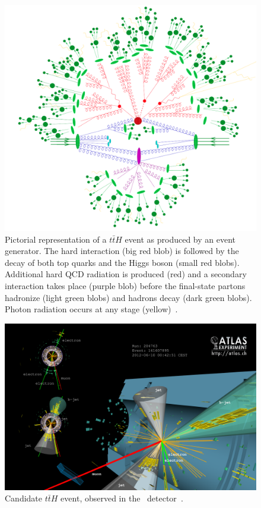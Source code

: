\begin{figure}[p]
  \centering
  \includegraphics[width=\textwidth, clip=true, trim=0 0 0 0]
  {figs/mc_gen/full_mc_event.png}
  \caption[
    Pictorial representation of a $t\bar{t}H$ event as produced by an event
    generator~\cite{Gleisberg:2008ta}.
  ]{
    Pictorial representation of a $t\bar{t}H$ event as produced by an event
    generator.
    The hard interaction (big red blob) is followed by the decay of both top
    quarks and the Higgs boson (small red blobs).
    Additional hard QCD radiation is produced (red) and a secondary
    interaction takes place (purple blob) before the final-state partons
    hadronize (light green blobs) and hadrons decay (dark green blobs).
    Photon radiation occurs at any stage (yellow)~\cite{Gleisberg:2008ta}.
  }
  \label{fig:mc_event}
\end{figure}

\begin{figure}[ht]
  \centering
  \includegraphics[width=\textwidth, clip=true, trim=0 0 0 0]
  {figs/mc_gen/tth_event.png}
  \caption{
    Candidate $t\bar{t}H$ event, observed in the
    \ATLAS\ detector~\cite{Aad:2015iha}.
  }
  \label{fig:data_event}
\end{figure}

